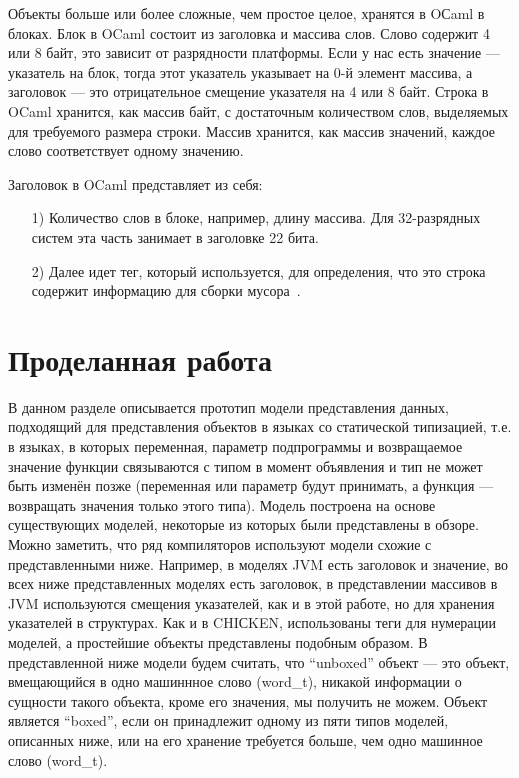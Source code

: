\documentclass[12pt,a4paper]{article}
\begin{document}
Объекты больше или более сложные, чем простое целое, хранятся в OСaml в блоках.
Блок в OCaml состоит из заголовка и массива слов. Слово содержит 4 или 8 байт, это зависит от разрядности платформы.
Если у нас есть значение — указатель на блок,
тогда этот указатель указывает на 0-й элемент массива, а
заголовок --- это отрицательное смещение указателя на 4 или 8 байт.
Строка в OCaml хранится, как массив байт,
с достаточным количеством слов, выделяемых для требуемого размера строки.
Массив хранится, как массив значений,
каждое слово соответствует одному значению.

Заголовок в OCaml представляет из себя:
\begin{enumerate}
\item[1)] Количество слов в блоке, например, длину массива. Для 32-разрядных систем эта часть занимает в заголовке 22 бита.
\item[2)] Далее идет тег, который используется, для определения, что это строка содержит информацию для сборки мусора~\cite{ocaml}.
\end{enumerate}



\newpage
\section {Проделанная работа}

В данном разделе описывается прототип модели представления данных,
подходящий для представления объектов в языках со статической типизацией, 
т.е. в языках, в которых переменная, параметр подпрограммы и
возвращаемое значение функции связываются с типом 
в момент объявления и тип не может быть изменён позже
(переменная или параметр будут принимать, а функция 
— возвращать значения только этого типа).
Модель построена на основе существующих моделей,
некоторые из которых были представлены в обзоре.
Можно заметить, что ряд компиляторов используют модели схожие с 
представленными ниже. 
Например, в моделях JVM
есть заголовок и значение, во всех ниже представленных моделях есть заголовок,
в представлении массивов в JVM используются смещения указателей,
как и в этой работе,
но для хранения указателей в структурах. 
Как и в CHIСKEN, использованы теги для нумерации моделей,
а простейшие объекты представлены подобным образом.
В представленной ниже модели будем считать, что ``unboxed''  объект — это объект,
вмещающийся в одно машиннное слово (word\_t), 
никакой информации о сущности такого объекта, кроме его значения, мы получить не можем.
Объект является ``boxed'', если он принадлежит одному из пяти
типов моделей, описанных ниже, или на его хранение требуется больше,
чем одно машинное слово (word\_t).
\end{document}
